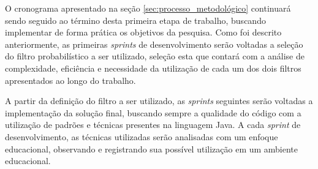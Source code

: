 O cronograma apresentado na seção \ref{sec:processo_metodológico} continuará sendo seguido ao término desta primeira etapa de trabalho, buscando implementar de forma prática os objetivos da pesquisa. Como foi descrito anteriormente, as primeiras \textit{sprints} de desenvolvimento serão voltadas a seleção do filtro probabilístico a ser utilizado, seleção esta que contará com a análise de complexidade, eficiência e necessidade da utilização de cada um dos dois filtros apresentados ao longo do trabalho. 

A partir da definição do filtro a ser utilizado, as \textit{sprints} seguintes serão voltadas a implementação da solução final, buscando sempre a qualidade do código com a utilização de padrões e técnicas presentes na linguagem Java. A cada \textit{sprint} de desenvolvimento, as técnicas utilizadas serão analisadas com um enfoque educacional, observando e registrando sua possível utilização em um ambiente educacional.